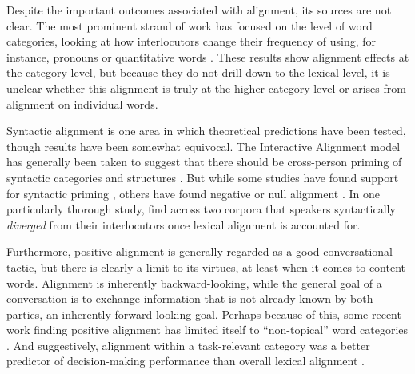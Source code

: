 \documentclass[11pt]{article}
\begin{document}
Despite the important outcomes associated with alignment, its sources are not clear. The most prominent strand of work has focused on the level of word categories, looking at how interlocutors change their frequency of using, for instance, pronouns or quantitative words \cite{DNMEtAl2012,IrelandEtAl2011}. These results show alignment effects at the category level, but because they do not drill down to the lexical level, it is unclear whether this alignment is truly at the higher category level or arises from alignment on individual words.

Syntactic alignment is one area in which theoretical predictions have been tested, though results have been somewhat equivocal. The Interactive Alignment model has generally been taken to suggest that there should be cross-person priming of syntactic categories and structures \cite{PickeringGarrod2004} . But while some studies have found support for syntactic priming \cite{gries2005syntactic,dubey2005parallelism}, others have found negative or null alignment \cite{HealeyPurverHowes2014,reitter2010priming}. In one particularly thorough study, \cite{HealeyPurverHowes2014} find across two corpora that speakers syntactically \emph{diverged} from their interlocutors once lexical alignment is accounted for.








Furthermore, positive alignment is generally regarded as a good conversational tactic, but there is clearly a limit to its virtues, at least when it comes to content words. Alignment is inherently backward-looking, while the general goal of a conversation is to exchange information that is not already known by both parties, an inherently forward-looking goal. Perhaps because of this, some  recent work finding positive alignment has limited itself to ``non-topical'' word categories \cite{DNMGamonDumais2011,DoyleYurovskyFrank2016}. And suggestively, alignment within a task-relevant category was a better predictor of decision-making performance than overall lexical alignment \cite{FusaroliEtAl2012}.
\end{document}
